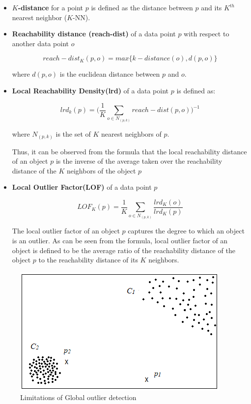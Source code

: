 	
		\begin{itemize}
		\item \textbf{$K$-distance} for a point $p$ is defined as the distance between $p$
		and its $K^{th}$ nearest neighbor ($K$-NN).
		
		\item \textbf{Reachability distance (reach-dist)} of a data point $p$
		with respect to another data point $o$
		
		\[ reach-dist_K(p,o)=max\{k-distance(o),d(p,o)\}  \]
		
		where $d(p,o)$ is the euclidean distance between $p$
		and $o$. 
		
		
		\item \textbf{Local Reachability Density(lrd)}  of a data point $p$ is defined as:
		
		
		\[  lrd_k(p) =  \bigg( \frac{1}{K} \sum_{o \in N_{(p,k)}} reach-dist(p,o)   \bigg)^{-1}  \]
		
		
		where $N_{(p,k)}$ is the set of $K$ nearest neighbors of $p$.
		
		Thus, it can be observed from the formula that the local reachability distance of
		an object $p$ is the inverse of the average taken over the reachability distance of the $K$
		neighbors of the object $p$
		
		\item
		\textbf{Local Outlier Factor(LOF)}  of a data point $p$
		
		\[  LOF_K(p) = \frac{1}{K} \sum_{o \in N_{(p,k)}} \frac{lrd_K(o)}{lrd_K(p)}  \]
		
		The local outlier factor of an object $p$ captures the degree to which an object is an
		outlier. As can be seen from the formula, local outlier factor of an object is defined
		to be the average ratio of the reachability distance of the object $p$ to the reachability
		distance of its $K$ neighbors.
		
	\end{itemize}
	
		\begin{figure}[H]
		\centering
		\includegraphics{chap01/localvsglobal2.png}
		\caption{Limitations of Global outlier detection}
	\end{figure}
	
